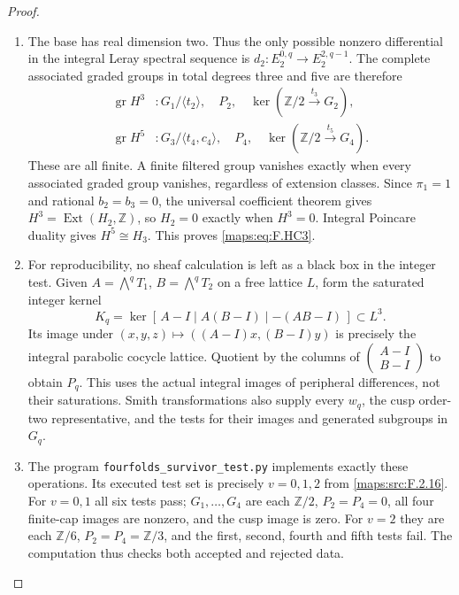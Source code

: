 \begin{proof}
\begin{enumerate}[label=\arabic*.]
\item The base has real dimension two.
Thus the only possible nonzero differential in the
integral Leray spectral sequence is
$d_2:E_2^{0,q}\to E_2^{2,q-1}$.
The complete associated graded groups in total
degrees three and five are therefore
\[
\begin{split}
 \operatorname{gr}H^3&:
   G_1/\langle t_2\rangle,\quad P_2,\quad
   \ker(\mathbb Z/2\xrightarrow{\,t_3\,}G_2),\\
 \operatorname{gr}H^5&:
   G_3/\langle t_4,c_4\rangle,\quad P_4,\quad
   \ker(\mathbb Z/2\xrightarrow{\,t_5\,}G_4).
\end{split}
\tag{F.HC10}\label{maps:eq:F.HC10}
\]
These are all finite.  A finite filtered group
vanishes exactly when every associated graded group
vanishes, regardless of extension classes.
Since $\pi_1=1$ and rational $b_2=b_3=0$, the universal
coefficient theorem gives
$H^3=\operatorname{Ext}(H_2,\mathbb Z)$, so
$H_2=0$ exactly when $H^3=0$.
Integral Poincare duality gives $H^5\cong H_3$.
This proves \eqref{maps:eq:F.HC3}.

\item For reproducibility, no sheaf calculation is left
as a black box in the integer test.
Given $A=\bigwedge^qT_1$, $B=\bigwedge^qT_2$ on a
free lattice $L$, form the saturated integer kernel
\[
 K_q=\ker[\,A-I\mid A(B-I)\mid -(AB-I)\,]\subset L^3.
 \tag{F.HC11}\label{maps:eq:F.HC11}
\]
Its image under
$(x,y,z)\mapsto((A-I)x,(B-I)y)$ is precisely the
integral parabolic cocycle lattice.
Quotient by the columns of
$\left(\begin{smallmatrix}A-I\\B-I\end{smallmatrix}\right)$
to obtain $P_q$.
This uses the actual integral images of peripheral
differences, not their saturations.
Smith transformations also supply every $w_q$, the
cusp order-two representative, and the tests for
their images and generated subgroups in $G_q$.

\item The program \texttt{fourfolds\_survivor\_test.py}
implements exactly these operations.
Its executed test set is precisely $v=0,1,2$ from
\ref{maps:src:F.2.16}.  For $v=0,1$ all six tests pass;
$G_1,\ldots,G_4$ are each $\mathbb Z/2$,
$P_2=P_4=0$, all four finite-cap images are nonzero,
and the cusp image is zero.
For $v=2$ they are each $\mathbb Z/6$,
$P_2=P_4=\mathbb Z/3$, and the first, second,
fourth and fifth tests fail.  The computation thus
checks both accepted and rejected data.


\end{enumerate}
\end{proof}

